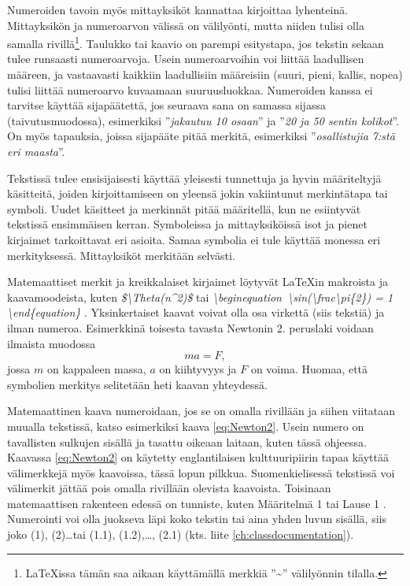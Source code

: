 \documentclass[globalnumbering,centeredcaptions,draftfooter]{tutthesis/tutthesis} %
\begin{document}
Numeroiden tavoin myös mittayksiköt kannattaa kirjoittaa lyhenteinä.
Mittayksikön ja numeroarvon välissä on välilyönti, mutta niiden tulisi olla samalla rivillä\footnote{LaTeXissa tämän saa aikaan käyttämällä merkkiä ''\textasciitilde'' välilyönnin tilalla.}.
Taulukko tai kaavio on parempi esitystapa, jos tekstin sekaan tulee runsaasti numeroarvoja.
Usein numeroarvoihin voi liittää laadullisen määreen, ja vastaavasti kaikkiin laadullisiin määreisiin (suuri, pieni, kallis, nopea) tulisi liittää numeroarvo kuvaamaan suuruusluokkaa.
Numeroiden kanssa ei tarvitse käyttää sijapäätettä, jos seuraava sana on samassa sijassa (taivutusmuodossa), esimerkiksi ''\emph{jakautuu 10 osaan}'' ja ''\emph{20 ja 50 sentin kolikot}''.
On myös tapauksia, joissa sijapääte pitää merkitä, esimerkiksi ''\emph{osallistujia 7:stä eri maasta}''.

Tekstissä tulee ensisijaisesti käyttää yleisesti tunnettuja ja hyvin määriteltyjä käsitteitä, joiden kirjoittamiseen on yleensä jokin vakiintunut merkintätapa tai symboli.
Uudet käsitteet ja merkinnät pitää määritellä, kun ne esiintyvät tekstissä ensimmäisen kerran.
Symboleissa ja mittayksiköissä isot ja pienet kirjaimet tarkoittavat eri asioita.
Samaa symbolia ei tule käyttää monessa eri merkityksessä.
Mittayksiköt merkitään selvästi.


Matemaattiset merkit ja kreikkalaiset kirjaimet löytyvät LaTeXin makroista ja kaavamoodeista, kuten
\emph{\$\textbackslash Theta(n\textasciicircum2)\$}
tai
\emph{\textbackslash begin\textbraceleft equation\textbraceright\ \textbackslash sin(\textbackslash frac\textbraceleft \textbackslash pi\textbraceright\{2\}) = 1 \textbackslash end\{equation\}}
.
Yksinkertaiset kaavat voivat olla osa virkettä (siis tekstiä) ja ilman numeroa.
Esimerkkinä toisesta tavasta Newtonin 2. peruslaki voidaan ilmaista muodossa
\begin{equation} %
\label{eq:Newton2} ma = F,
\end{equation} %
jossa $m$ on kappaleen massa, $a$ on kiihtyvyys ja $F$ on voima.
Huomaa, että symbolien merkitys selitetään heti kaavan yhteydessä.


Matemaattinen kaava numeroidaan, jos se on omalla rivillään ja siihen viitataan muualla tekstissä, katso esimerkiksi kaava \eqref{eq:Newton2}.
Usein numero on tavallisten sulkujen sisällä ja tasattu oikeaan laitaan, kuten tässä ohjeessa.
Kaavassa \eqref{eq:Newton2} on käytetty englantilaisen kulttuuripiirin tapaa käyttää välimerkkejä myös kaavoissa, tässä lopun pilkkua.
Suomenkielisessä tekstissä voi välimerkit jättää pois omalla rivillään olevista kaavoista.
Toisinaan matemaattisen rakenteen edessä on tunniste, kuten Määritelmä 1 tai Lause 1 \citep{Ruohonen2009}.
Numerointi voi olla juokseva läpi koko tekstin tai aina yhden luvun sisällä, siis joko (1), (2)\ldots tai (1.1), (1.2),\ldots, (2.1) (kts. liite \ref{ch:classdocumentation}).
\end{document}
